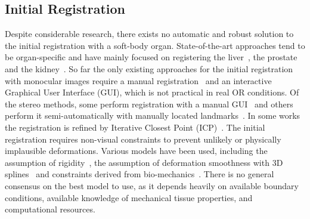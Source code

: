 \subsection{Initial Registration}

Despite considerable research, there exists no automatic and robust solution to the initial registration with a soft-body organ. State-of-the-art approaches tend to be organ-specific and have mainly focused on registering the liver~\cite{haouchine13,haouchine:hal-01186011,plantefeve:hal-01205194}, the prostate~\cite{Cohen2010Prostate} and the kidney~\cite{Su2009,nosrati2014simultaneous,affineTracking}.
So far the only existing approaches for the initial registration with monocular images require a manual registration~\cite{affineTracking} and an interactive Graphical User Interface (GUI), which is not practical in real OR conditions.
Of the stereo methods, some perform registration with a manual GUI~\cite{Cohen2010Prostate,haouchine13} and others perform it semi-automatically with manually located landmarks~\cite{21142942,conf/miccai/Amir-KhaliliNPHA13,hamarneh2014igrs,Su2009}. In some works the registration is refined by Iterative Closest Point (ICP)~\cite{hamarneh2014igrs,Su2009}. %
The initial registration requires non-visual constraints to prevent unlikely or physically implausible deformations. Various models have been used, including the assumption of rigidity~\cite{Su2009}, the assumption of deformation smoothness with 3D splines~\cite{conf/miccai/Amir-KhaliliNPHA13} and constraints derived from bio-mechanics~\cite{hamarneh2014igrs,haouchine13}. 
There is no general consensus on the best model to use, as it depends heavily on available boundary conditions, available knowledge of mechanical tissue properties, and computational resources.

